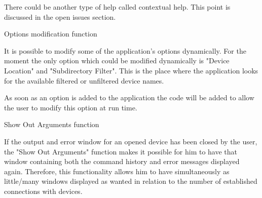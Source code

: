 There could be another type of help called contextual help. This point is
discussed in the open issues section.


	{Options modification function}

It is possible to modify some of the application's options dynamically. For the
moment the only option which could be modified dynamically is "Device Location"
and "Subdirectory Filter". This is the place where the application looks for 
the available filtered or unfiltered device names.

As soon as an option is added to the application the code will be added to allow
the user to modify this option at run time.


  {Show Out Arguments function}

If the output and error window for an opened device has been closed by the user,
the "Show Out Arguments" function makes it possible for him to have 
that window containing both the command history and     
error messages displayed again. Therefore, this functionality allows him to 
have simultaneously as little/many windows displayed as wanted in relation to 
the number of established connections with devices.


